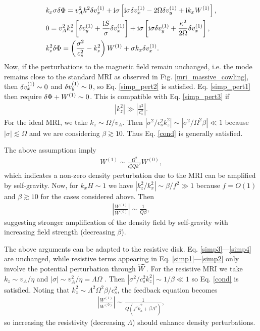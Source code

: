 \begin{align}
  &   k_x\sigma \delta \Phi = v_A^2k^2\delta v_x^{(1)} + \mathrm{i}\sigma\left[\mathrm{i}\sigma
  \delta v_x^{(1)} - 2\Omega\delta v_y^{(1)} + \mathrm{i} k_x W^{(1)}\right], \label{simp_pert1}\\ 
  &  0= v_A^2k_z^2\left[\delta v_y^{(1)} + \frac{\mathrm{i} S
    }{\sigma}\delta v_x^{(1)}\right] + \mathrm{i}\sigma\left[\mathrm{i}\sigma\delta v_y^{(1)} +
  \frac{\kappa^2}{2\Omega}\delta v_x^{(1)}\right],\label{simp_pert2}\\
  & k_z^2\delta \Phi  = \left(\frac{\sigma^2}{c_s^2}-k_z^2\right)W^{(1)} +
  \sigma k_x \delta v_x^{(1)}.\label{simp_pert3} 
\end{align}
Now, if the perturbations to the magnetic field remain
unchanged, i.e. the mode remains close to the standard MRI as observed
in Fig. \ref{mri_massive_cowling}, then $\delta v_x^{(1)} \sim 0$ and
$\delta v_y^{(1)}\sim0$, so Eq. \ref{simp_pert2} is 
satisfied. Eq. \ref{simp_pert1} then require $\delta \Phi +
W^{(1)}\sim0$. This is compatible with Eq. \ref{simp_pert3} if 
\begin{align}
  \left|k_z^2\right| \gg \left|\frac{\sigma^2}{c_s^2}\right|. \label{cond}
\end{align}
For the ideal MRI,  we take $k_z\sim \Omega/v_A$. Then
$|\sigma^2/c_s^2k_z^2|\sim |\sigma^2/\Omega^2\beta|\ll1$ because
$|\sigma|\lesssim \Omega$ and we are considering $\beta\gtrsim 10$. 
Thus Eq. \ref{cond} is generally satisfied.   

The above assumptions imply
\begin{align}
  W^{(1)} \sim \frac{\Omega^2}{c_s^2 Q k^2} W^{(0)},\label{feedback}
\end{align} 
which indicates a non-zero density perturbation due to the
MRI can be amplified by self-gravity. Now, for $k_xH\sim 1$ we have
$|k_z^2/k_x^2|\sim \beta/f^2\gg1$ because $f=O(1)$ and $\beta\gtrsim10$
for the cases considered above. Then
\begin{align}
  \left|\frac{W^{(1)}}{W^{(0)}}\right| \sim \frac{1}{Q\beta}, 
\end{align}
 suggesting stronger amplification of the density field by 
 self-gravity with increasing field strength (decreasing
 $\beta$). 

 

 The above arguments can be adapted to the resistive
 disk. Eq. \ref{simp3}---\ref{simp4} are unchanged, while resistive
 terms appearing in Eq. \ref{simp1}---\ref{simp2} only involve the
 potential perturbation through $\widetilde{W}$. For the resistive MRI we take
 $k_z\sim v_A/\eta$ and $|\sigma|\sim v_A^2/\eta = \Lambda\Omega$
 \citep{sano99}. Then $|\sigma^2/c_s^2k_z^2|\sim 1/\beta \ll 1$ so
 Eq. \ref{cond} is satisfied. Noting that $k_z^2\sim
 \Lambda^2\Omega^2\beta/c_s^2$, the feedback equation becomes
 \begin{align}
   \left|\frac{W^{(1)}}{W^{(0)}}\right| \sim
   \frac{1}{Q\left(f^2\hat{k}_x^2 + \beta\Lambda^2\right)},
 \end{align}
 so increasing the resistivity (decreasing $\Lambda$) should enhance
 density perturbations.  

